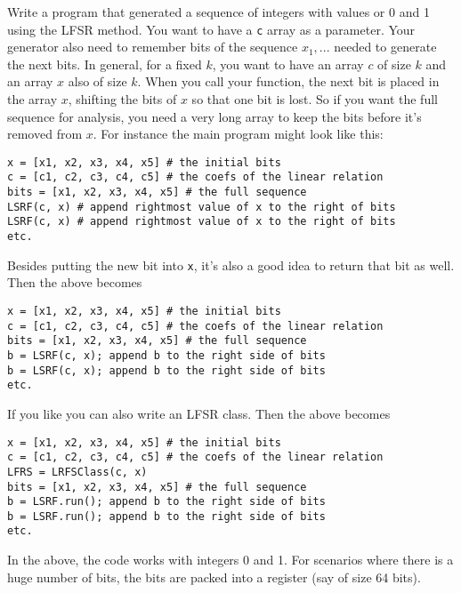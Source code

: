   Write a program that generated a sequence of integers with values or 0 and 1
  using the LFSR method.
  You want to have a \verb!c! array as a parameter.
  Your generator also need to remember bits of the sequence $x_1, ...$ needed to
  generate the next bits.
  In general, for a fixed $k$, you want to have an array $c$ of size $k$
  and an array $x$ also of size $k$.
  When you call your function, the next bit is placed in the array $x$,
  shifting the bits of $x$ so that one bit is lost.
  So if you want the full sequence for analysis, you need a very long
  array to keep the bits before it's removed from $x$.
  For instance the main program might look like this:
  \begin{Verbatim}[frame=single, fontsize=\small]
x = [x1, x2, x3, x4, x5] # the initial bits
c = [c1, c2, c3, c4, c5] # the coefs of the linear relation
bits = [x1, x2, x3, x4, x5] # the full sequence
LSRF(c, x) # append rightmost value of x to the right of bits
LSRF(c, x) # append rightmost value of x to the right of bits
etc.
\end{Verbatim}
Besides putting the new bit into \verb!x!, it's also a good idea to
return that bit as well.
Then the above becomes
  \begin{Verbatim}[frame=single, fontsize=\small]
x = [x1, x2, x3, x4, x5] # the initial bits
c = [c1, c2, c3, c4, c5] # the coefs of the linear relation
bits = [x1, x2, x3, x4, x5] # the full sequence
b = LSRF(c, x); append b to the right side of bits
b = LSRF(c, x); append b to the right side of bits
etc.
\end{Verbatim}
If you like you can also write an LFSR class.
Then the above becomes
  \begin{Verbatim}[frame=single, fontsize=\small]
x = [x1, x2, x3, x4, x5] # the initial bits
c = [c1, c2, c3, c4, c5] # the coefs of the linear relation
LFRS = LRFSClass(c, x)
bits = [x1, x2, x3, x4, x5] # the full sequence
b = LSRF.run(); append b to the right side of bits
b = LSRF.run(); append b to the right side of bits
etc.
\end{Verbatim}
In the above, the code works with integers 0 and 1.
For scenarios where there is a huge number of bits, the
bits are packed into a register (say of size 64 bits).
